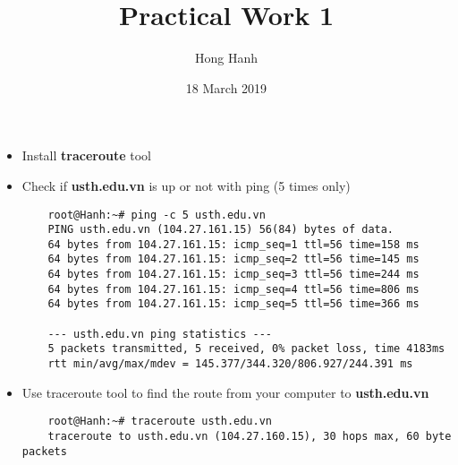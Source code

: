 \documentclass{article}
\title{Practical Work 1}
\author {Hong Hanh}
\date{18 March 2019}
\begin{document}
\maketitle

\begin{itemize}
    \item Install \textbf{traceroute} tool
    \item Check if \textbf{usth.edu.vn} is up or not with ping (5 times only)
    \begin{verbatim}
    root@Hanh:~# ping -c 5 usth.edu.vn
    PING usth.edu.vn (104.27.161.15) 56(84) bytes of data.
    64 bytes from 104.27.161.15: icmp_seq=1 ttl=56 time=158 ms
    64 bytes from 104.27.161.15: icmp_seq=2 ttl=56 time=145 ms
    64 bytes from 104.27.161.15: icmp_seq=3 ttl=56 time=244 ms
    64 bytes from 104.27.161.15: icmp_seq=4 ttl=56 time=806 ms
    64 bytes from 104.27.161.15: icmp_seq=5 ttl=56 time=366 ms

    --- usth.edu.vn ping statistics ---
    5 packets transmitted, 5 received, 0% packet loss, time 4183ms
    rtt min/avg/max/mdev = 145.377/344.320/806.927/244.391 ms
    \end{verbatim}
    \item Use traceroute tool to find the route from your computer to
\textbf{usth.edu.vn}
    \begin{verbatim}
    root@Hanh:~# traceroute usth.edu.vn
    traceroute to usth.edu.vn (104.27.160.15), 30 hops max, 60 byte packets
        
    \end{verbatim}
\end{itemize}
\end{document}
